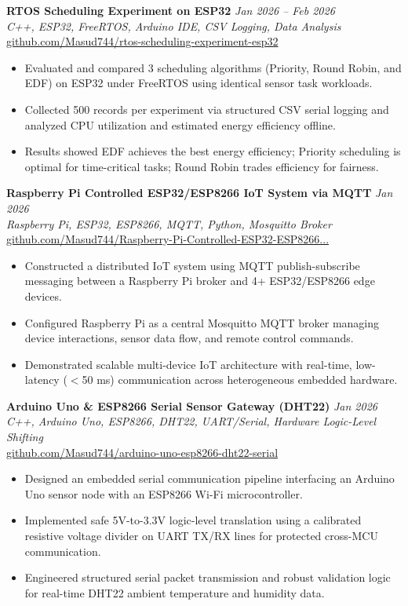 \documentclass[11pt,a4paper]{article}
\begin{document}
\textbf{RTOS Scheduling Experiment on ESP32} \hfill \textit{Jan 2026 -- Feb 2026} \\
\textit{C++, ESP32, FreeRTOS, Arduino IDE, CSV Logging, Data Analysis} \\
\href{https://github.com/Masud744/rtos-scheduling-experiment-esp32}{github.com/Masud744/rtos-scheduling-experiment-esp32}
\begin{itemize}
    \item Evaluated and compared 3 scheduling algorithms (Priority, Round Robin, and EDF) on ESP32 under FreeRTOS using identical sensor task workloads.
    \item Collected 500 records per experiment via structured CSV serial logging and analyzed CPU utilization and estimated energy efficiency offline.
    \item Results showed EDF achieves the best energy efficiency; Priority scheduling is optimal for time-critical tasks; Round Robin trades efficiency for fairness.
\end{itemize}

\textbf{Raspberry Pi Controlled ESP32/ESP8266 IoT System via MQTT} \hfill \textit{Jan 2026} \\
\textit{Raspberry Pi, ESP32, ESP8266, MQTT, Python, Mosquitto Broker} \\
\href{https://github.com/Masud744/Raspberry-Pi-Controlled-ESP32-ESP8266-IoT-System-using-MQTT-Test1}{github.com/Masud744/Raspberry-Pi-Controlled-ESP32-ESP8266...}
\begin{itemize}
    \item Constructed a distributed IoT system using MQTT publish-subscribe messaging between a Raspberry Pi broker and 4+ ESP32/ESP8266 edge devices.
    \item Configured Raspberry Pi as a central Mosquitto MQTT broker managing device interactions, sensor data flow, and remote control commands.
    \item Demonstrated scalable multi-device IoT architecture with real-time, low-latency ($<$50 ms) communication across heterogeneous embedded hardware.
\end{itemize}

\textbf{Arduino Uno \& ESP8266 Serial Sensor Gateway (DHT22)} \hfill \textit{Jan 2026} \\
\textit{C++, Arduino Uno, ESP8266, DHT22, UART/Serial, Hardware Logic-Level Shifting} \\
\href{https://github.com/Masud744/arduino-uno-esp8266-dht22-serial}{github.com/Masud744/arduino-uno-esp8266-dht22-serial}
\begin{itemize}
    \item Designed an embedded serial communication pipeline interfacing an Arduino Uno sensor node with an ESP8266 Wi-Fi microcontroller.
    \item Implemented safe 5V-to-3.3V logic-level translation using a calibrated resistive voltage divider on UART TX/RX lines for protected cross-MCU communication.
    \item Engineered structured serial packet transmission and robust validation logic for real-time DHT22 ambient temperature and humidity data.
\end{itemize}
\end{document}
